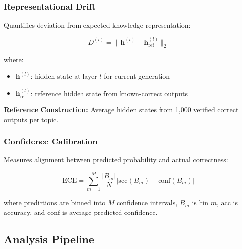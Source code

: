 \documentclass[11pt]{article}
\begin{document}
\subsubsection{Representational Drift}

Quantifies deviation from expected knowledge representation:

\begin{equation}
D^{(l)} = \|\mathbf{h}^{(l)} - \mathbf{h}_{\text{ref}}^{(l)}\|_2
\end{equation}

where:
\begin{itemize}
    \item $\mathbf{h}^{(l)}$: hidden state at layer $l$ for current generation
    \item $\mathbf{h}_{\text{ref}}^{(l)}$: reference hidden state from known-correct outputs
\end{itemize}

\textbf{Reference Construction:} Average hidden states from 1,000 verified correct outputs per topic.

\subsubsection{Confidence Calibration}

Measures alignment between predicted probability and actual correctness:

\begin{equation}
\text{ECE} = \sum_{m=1}^{M} \frac{|B_m|}{N} |\text{acc}(B_m) - \text{conf}(B_m)|
\end{equation}

where predictions are binned into $M$ confidence intervals, $B_m$ is bin $m$, $\text{acc}$ is accuracy, and $\text{conf}$ is average predicted confidence.

\subsection{Analysis Pipeline}
\end{document}
